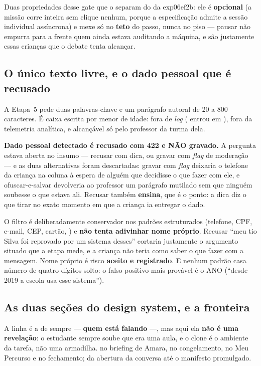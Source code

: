 Duas propriedades desse gate que o separam do da exp06ef2b: ele é
\textbf{opcional} (a missão corre inteira sem clique nenhum, porque a
especificação admite a sessão individual assíncrona) e mexe só no \textbf{teto}
do passo, nunca no piso --- pausar não empurra para a frente quem ainda estava
auditando a máquina, e são justamente essas crianças que o debate tenta
alcançar.

\subsection{O único texto livre, e o dado pessoal que é recusado}

A Etapa~5 pede duas palavras-chave e um parágrafo autoral de 20 a 800
caracteres. É caixa escrita por menor de idade: fora de \emph{log}
( entrou em ), fora da telemetria
analítica, e alcançável só pelo professor da turma dela.

\textbf{Dado pessoal detectado é recusado com 422 e NÃO gravado.} A pergunta
estava aberta no insumo --- recusar com dica, ou gravar com \emph{flag} de
moderação --- e as duas alternativas foram descartadas: gravar com \emph{flag}
deixaria o telefone da criança na coluna à espera de alguém que decidisse o que
fazer com ele, e ofuscar-e-salvar devolveria ao professor um parágrafo mutilado
sem que ninguém soubesse o que estava ali. Recusar também \textbf{ensina}, que é
o ponto: a dica diz o que tirar no exato momento em que a criança ia entregar o
dado.

\begin{nota}
O filtro é deliberadamente conservador nos padrões estruturados (telefone, CPF,
e-mail, CEP, cartão, ) e \textbf{não tenta adivinhar nome próprio}.
Recusar \enquote{meu tio Silva foi reprovado por um sistema desses} cortaria
justamente o argumento situado que a etapa mede, e a criança não teria como
saber o que fazer com a mensagem. Nome próprio é risco \textbf{aceito e
registrado}. E nenhum padrão casa número de quatro dígitos solto: o falso
positivo mais provável é o ANO (\enquote{desde 2019 a escola usa esse
sistema}).
\end{nota}

\subsection{As duas seções do design system, e a fronteira}

A linha é a de sempre --- \textbf{quem está falando} ---, mas aqui ela
\textbf{não é uma revelação}: o estudante sempre soube que era uma aula, e o
clone é o ambiente da tarefa, não uma armadilha.  no briefing de
Amara, no congelamento, no Meu Percurso e no fechamento;  da abertura
da conversa até o manifesto promulgado.

